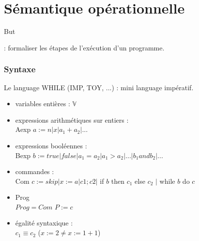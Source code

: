 \documentclass[10pt,a4paper]{article}
\begin{document}
\part{Sémantique opérationnelle}

\subparagraph*{But} : formaliser les étapes de l'exécution d'un programme.

\section{Syntaxe}
Le language WHILE (IMP, TOY, ...) : mini language impératif.
\begin{itemize}
\item variables entières : $\mathbb{V}$
\item expressions arithmétiques sur entiers : \\
Aexp $ a := n \vert x \vert a_1 + a_2 \vert ...$
\item expressions booléennes : \\
Bexp $ b := true | false | a_1 = a_2 | a_1 > a_2 | ... | b_1 and b_2 | ...$
\item commandes : \\
Com $c := skip \vert x := a | c1; c2 |$ if $b$ then $c_1$ else $c_2$ $|$ while $b$ do $c$
\item Prog \\
$Prog = Com$ $P := c$
\item égalité syntaxique : \\
$c_1 \equiv c_2$ ($x := 2 \neq x := 1 + 1$)
\end{itemize}
\end{document}
